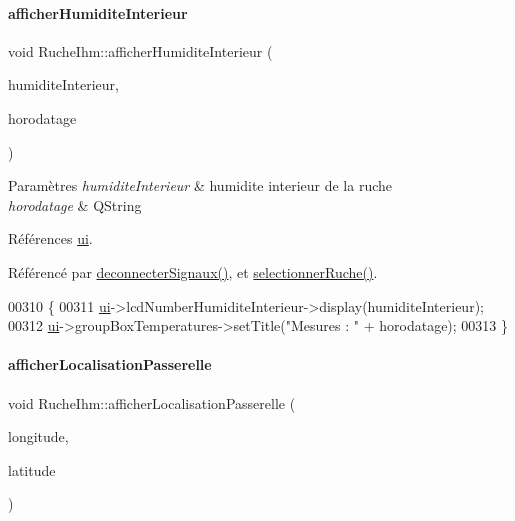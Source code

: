 \paragraph{\texorpdfstring{afficher\+Humidite\+Interieur}{afficherHumiditeInterieur}}
{\footnotesize\ttfamily void Ruche\+Ihm\+::afficher\+Humidite\+Interieur (\begin{DoxyParamCaption}\item[{double}]{humidite\+Interieur,  }\item[{Q\+String}]{horodatage }\end{DoxyParamCaption})\hspace{0.3cm}{\ttfamily [slot]}}


\begin{DoxyParams}{Paramètres}
{\em humidite\+Interieur} & humidite interieur de la ruche \\
\hline
{\em horodatage} & Q\+String \\
\hline
\end{DoxyParams}


Références \hyperlink{class_ruche_ihm_a64786058bd7f88ca2f1e9743bb27c25b}{ui}.



Référencé par \hyperlink{class_ruche_ihm_a348a76106f3072dd31a382c6025b8113}{deconnecter\+Signaux()}, et \hyperlink{class_ruche_ihm_a7324ae6ea574ccdad47783f466933157}{selectionner\+Ruche()}.


\begin{DoxyCode}
00310 \{
00311     \hyperlink{class_ruche_ihm_a64786058bd7f88ca2f1e9743bb27c25b}{ui}->lcdNumberHumiditeInterieur->display(humiditeInterieur);
00312     \hyperlink{class_ruche_ihm_a64786058bd7f88ca2f1e9743bb27c25b}{ui}->groupBoxTemperatures->setTitle(\textcolor{stringliteral}{"Mesures : "} + horodatage);
00313 \}
\end{DoxyCode}
\mbox{\label{class_ruche_ihm_a47770b4dcfdaad34c66f6a8a5224a648}} 
\paragraph{\texorpdfstring{afficher\+Localisation\+Passerelle}{afficherLocalisationPasserelle}}
{\footnotesize\ttfamily void Ruche\+Ihm\+::afficher\+Localisation\+Passerelle (\begin{DoxyParamCaption}\item[{Q\+String}]{longitude,  }\item[{Q\+String}]{latitude }\end{DoxyParamCaption})\hspace{0.3cm}{\ttfamily [slot]}}

